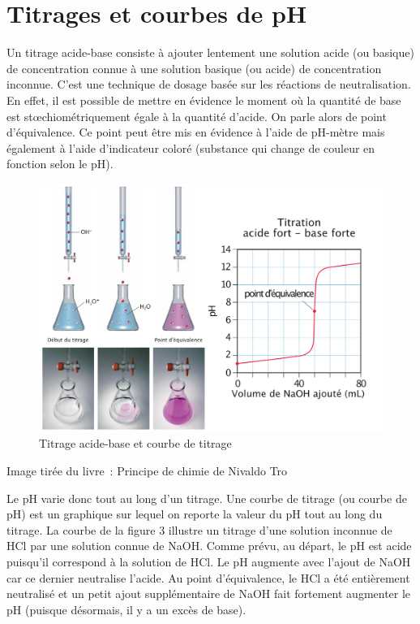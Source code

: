 \documentclass[
  11pt,
  french,
  a4paper,
  openany]{book}
\newenvironment{credit}
  {\vspace{-2em}\begin{center}\begin{footnotesize}\begin{textit}}
  {\end{textit}\end{footnotesize}\end{center}}
\begin{document}
\clearpage

\hypertarget{titrages-et-courbes-de-ph}{%
\section{Titrages et courbes de pH}\label{titrages-et-courbes-de-ph}}

Un titrage acide-base consiste à ajouter lentement une solution acide (ou basique) de concentration connue à une solution basique (ou acide) de concentration inconnue. C'est une technique de dosage basée sur les réactions de neutralisation. En effet, il est possible de mettre en évidence le moment où la quantité de base est stœchiométriquement égale à la quantité d'acide. On parle alors de point d'équivalence. Ce point peut être mis en évidence à l'aide de pH-mètre mais également à l'aide d'indicateur coloré (substance qui change de couleur en fonction selon le pH).

\begin{figure}

{\centering \includegraphics[width=1\linewidth]{images/acides-bases-5} 

}

\caption{Titrage acide-base et courbe de titrage}\label{fig:acides-bases-5}
\end{figure}

\begin{credit}
Image tirée du livre~: Principe de chimie de Nivaldo Tro

\end{credit}

Le pH varie donc tout au long d'un titrage. Une courbe de titrage (ou courbe de pH) est un graphique sur lequel on reporte la valeur du pH tout au long du titrage. La courbe de la figure 3 illustre un titrage d'une solution inconnue de HCl par une solution connue de NaOH. Comme prévu, au départ, le pH est acide puisqu'il correspond à la solution de HCl. Le pH augmente avec l'ajout de NaOH car ce dernier neutralise l'acide. Au point d'équivalence, le HCl a été entièrement neutralisé et un petit ajout supplémentaire de NaOH fait fortement augmenter le pH (puisque désormais, il y a un excès de base).
\end{document}
